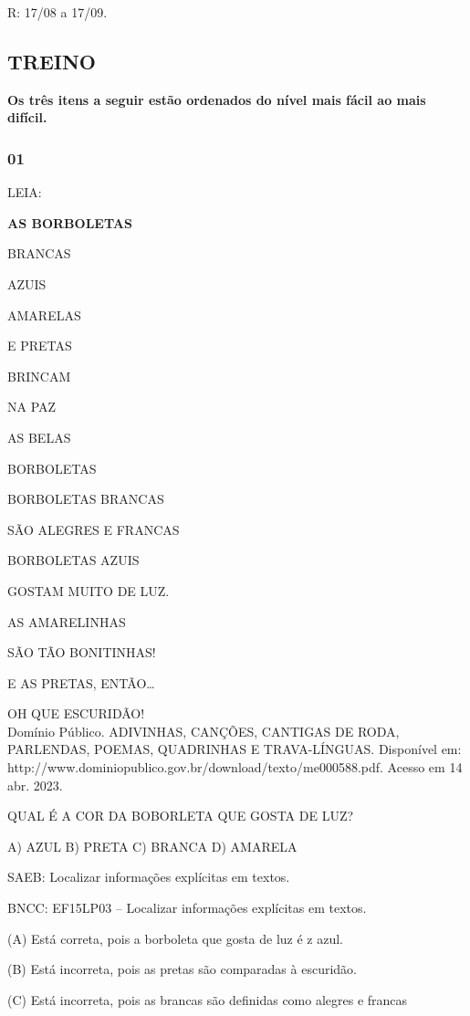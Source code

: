R: 17/08 a 17/09.

\subsection{TREINO}\label{treino-2}

\textbf{Os três itens a seguir estão ordenados do nível mais fácil ao mais
difícil. }

\subsubsection{01}\label{section-8}

LEIA:

\textbf{AS BORBOLETAS}

BRANCAS

AZUIS

AMARELAS

E PRETAS

BRINCAM

NA PAZ

AS BELAS

BORBOLETAS

BORBOLETAS BRANCAS

SÃO ALEGRES E FRANCAS

BORBOLETAS AZUIS

GOSTAM MUITO DE LUZ.

AS AMARELINHAS

SÃO TÃO BONITINHAS!

E AS PRETAS, ENTÃO\ldots{}

OH QUE ESCURIDÃO!\\

Domínio Público. ADIVINHAS, CANÇÕES, CANTIGAS DE RODA, PARLENDAS, POEMAS, QUADRINHAS E TRAVA-LÍNGUAS. Disponível em: http://www.dominiopublico.gov.br/download/texto/me000588.pdf. Acesso em 14 abr. 2023.

QUAL É A COR DA BOBORLETA QUE GOSTA DE LUZ?


A) AZUL
B) PRETA
C) BRANCA
D) AMARELA


\protect\hypertarget{_heading=h.z337ya}{}{}SAEB: Localizar informações explícitas em textos.

BNCC: EF15LP03 -- Localizar informações explícitas em textos.

(A) Está correta, pois a borboleta que gosta de luz é z azul.

(B) Está incorreta, pois as pretas são comparadas à escuridão.

(C) Está incorreta, pois as brancas são definidas como alegres e francas

